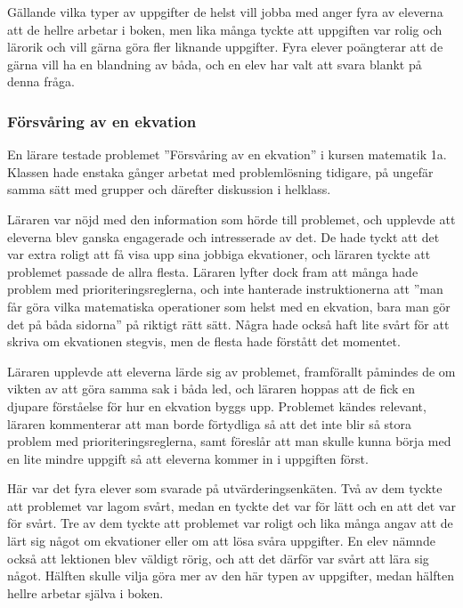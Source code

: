        \textcolor{lila}{Gällande vilka typer av uppgifter de helst vill jobba med anger fyra av eleverna att de hellre arbetar i boken, men lika många tyckte att uppgiften var rolig och lärorik och vill gärna göra fler liknande uppgifter. Fyra elever poängterar att de gärna vill ha en blandning av båda, och en elev har valt att svara blankt på denna fråga.}
        
    \subsubsection{Försvåring av en ekvation}
        \label{resultat:ekvation}
        \textcolor{lila}{En lärare testade problemet ''Försvåring av en ekvation'' i kursen matematik 1a. Klassen hade enstaka gånger arbetat med problemlösning tidigare, på ungefär samma sätt med grupper och därefter diskussion i helklass.}
        
        \textcolor{lila}{Läraren var nöjd med den information som hörde till problemet, och upplevde att eleverna blev ganska engagerade och intresserade av det. De hade tyckt att det var extra roligt att få visa upp sina jobbiga ekvationer, och läraren tyckte att problemet passade de allra flesta. Läraren lyfter dock fram att många hade problem med prioriteringsreglerna, och inte hanterade instruktionerna att ''man får göra vilka matematiska operationer som helst med en ekvation, bara man gör det på båda sidorna'' på riktigt rätt sätt. Några hade också haft lite svårt för att skriva om ekvationen stegvis, men de flesta hade förstått det momentet.}
        
        \textcolor{lila}{Läraren upplevde att eleverna lärde sig av problemet, framförallt påmindes de om vikten av att göra samma sak i båda led, och läraren hoppas att de fick en djupare förståelse för hur en ekvation byggs upp. Problemet kändes relevant, läraren kommenterar att man borde förtydliga så att det inte blir så stora problem med prioriteringsreglerna, samt föreslår att man skulle kunna börja med en lite mindre  uppgift så att eleverna kommer in i uppgiften först.}
        
        \textcolor{lila}{Här var det fyra elever som svarade på utvärderingsenkäten. Två av dem tyckte att problemet var lagom svårt, medan en tyckte det var för lätt och en att det var för svårt. Tre av dem tyckte att problemet var roligt och lika många angav att de lärt sig något om ekvationer eller om att lösa svåra uppgifter. En elev nämnde också att lektionen blev väldigt rörig, och att det därför var svårt att lära sig något. Hälften skulle vilja göra mer av den här typen av uppgifter, medan hälften hellre arbetar själva i boken.}

